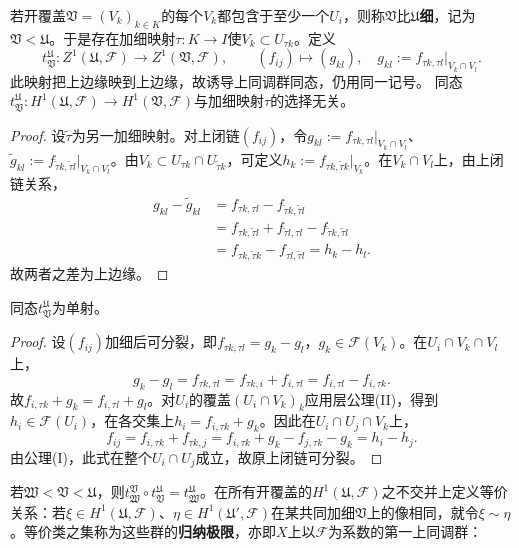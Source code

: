若开覆盖$\mathfrak V=(V_k)_{k\in K}$的每个$V_k$都包含于至少一个$U_i$，则称$\mathfrak V$比$\mathfrak U$\textbf{细}，记为$\mathfrak V<\mathfrak U$。于是存在加细映射$\tau:K\to I$使$V_k\subset U_{\tau k}$。定义
\[
t_{\mathfrak V}^{\mathfrak U}:Z^1(\mathfrak U,\mathcal F)\to Z^1(\mathfrak V,\mathcal F),\qquad
(f_{ij})\mapsto(g_{kl}),\quad g_{kl}:=f_{\tau k,\tau l}|_{V_k\cap V_l}.
\]
此映射把上边缘映到上边缘，故诱导上同调群同态，仍用同一记号。
同态$t_{\mathfrak V}^{\mathfrak U}:H^1(\mathfrak U,\mathcal F)\to H^1(\mathfrak V,\mathcal F)$与加细映射$\tau$的选择无关。
\begin{proof}
设$\widetilde\tau$为另一加细映射。对上闭链$(f_{ij})$，令$g_{kl}:=f_{\tau k,\tau l}|_{V_k\cap V_l}$、$\widetilde g_{kl}:=f_{\widetilde\tau k,\widetilde\tau l}|_{V_k\cap V_l}$。由$V_k\subset U_{\tau k}\cap U_{\widetilde\tau k}$，可定义$h_k:=f_{\tau k,\widetilde\tau k}|_{V_k}$。在$V_k\cap V_l$上，由上闭链关系，
\begin{align*}
g_{kl}-\widetilde g_{kl}&=f_{\tau k,\tau l}-f_{\widetilde\tau k,\widetilde\tau l}\\
&=f_{\tau k,\widetilde\tau l}+f_{\widetilde\tau l,\tau l}-f_{\widetilde\tau k,\widetilde\tau l}\\
&=f_{\tau k,\widetilde\tau k}-f_{\tau l,\widetilde\tau l}=h_k-h_l.
\end{align*}
故两者之差为上边缘。
\end{proof}
同态$t_{\mathfrak V}^{\mathfrak U}$为单射。
\begin{proof}
设$(f_{ij})$加细后可分裂，即$f_{\tau k,\tau l}=g_k-g_l$，$g_k\in\mathcal F(V_k)$。在$U_i\cap V_k\cap V_l$上，
\[
g_k-g_l=f_{\tau k,\tau l}=f_{\tau k,i}+f_{i,\tau l}=f_{i,\tau l}-f_{i,\tau k}.
\]
故$f_{i,\tau k}+g_k=f_{i,\tau l}+g_l$。对$U_i$的覆盖$(U_i\cap V_k)_k$应用层公理(II)，得到$h_i\in\mathcal F(U_i)$，在各交集上$h_i=f_{i,\tau k}+g_k$。因此在$U_i\cap U_j\cap V_k$上，
\[
f_{ij}=f_{i,\tau k}+f_{\tau k,j}=f_{i,\tau k}+g_k-f_{j,\tau k}-g_k=h_i-h_j.
\]
由公理(I)，此式在整个$U_i\cap U_j$成立，故原上闭链可分裂。
\end{proof}
若$\mathfrak W<\mathfrak V<\mathfrak U$，则$t_{\mathfrak W}^{\mathfrak V}\circ t_{\mathfrak V}^{\mathfrak U}=t_{\mathfrak W}^{\mathfrak U}$。在所有开覆盖的$H^1(\mathfrak U,\mathcal F)$之不交并上定义等价关系：若$\xi\in H^1(\mathfrak U,\mathcal F)$、$\eta\in H^1(\mathfrak U',\mathcal F)$在某共同加细$\mathfrak V$上的像相同，就令$\xi\sim\eta$。等价类之集称为这些群的\textbf{归纳极限}，亦即$X$上以$\mathcal F$为系数的第一上同调群：

